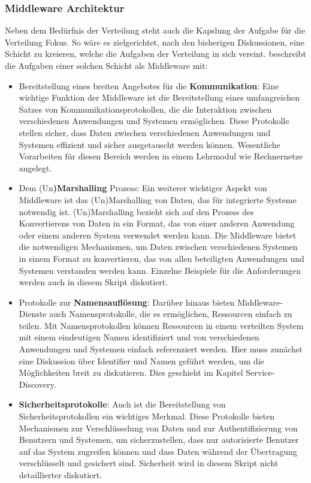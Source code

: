 \documentclass[../vs-script-first-v01.tex]{subfiles}
\begin{document}
\subsubsection{Middleware Architektur}
Neben dem Bedürfnis der Verteilung steht auch die Kapslung der Aufgabe für die Verteilung Fokus. So wäre es zielgerichtet, nach den bisherigen Diskussionen, eine Schicht zu kreieren, welche die Aufgaben der Verteilung in sich vereint.
\cite{tanenbaum2017distributed} beschreibt die Aufgaben einer solchen Schicht als Middleware mit:
\begin{itemize}
\item Bereitstellung eines breiten Angebotes für die \textbf{Kommunikation}: 
Eine wichtige Funktion der Middleware ist die Bereitstellung eines umfangreichen Satzes von Kommunikationsprotokollen, die die Interaktion zwischen verschiedenen Anwendungen und Systemen ermöglichen. Diese Protokolle stellen sicher, dass Daten zwischen verschiedenen Anwendungen und Systemen effizient und sicher ausgetauscht werden können. Wesentliche Vorarbeiten für diesen Bereich werden in einem Lehrmodul wie Rechnernetze angelegt.
\item Dem (Un\textbf{)Marshalling} Prozess: Ein weiterer wichtiger Aspekt von Middleware ist das (Un)Marshalling von Daten, das für integrierte Systeme notwendig ist. (Un)Marshalling bezieht sich auf den Prozess des Konvertierens von Daten in ein Format, das von einer anderen Anwendung oder einem anderen System verwendet werden kann. Die Middleware bietet die notwendigen Mechanismen, um Daten zwischen verschiedenen Systemen in einem Format zu konvertieren, das von allen beteiligten Anwendungen und Systemen verstanden werden kann. Einzelne Beispiele für die Anforderungen werden auch in diesem Skript diskutiert. 
\item Protokolle zur \textbf{Namensauflösung}: Darüber hinaus bieten Middleware-Dienste auch Namensprotokolle, die es ermöglichen, Ressourcen einfach zu teilen. Mit Namensprotokollen können Ressourcen in einem verteilten System mit einem eindeutigen Namen identifiziert und von verschiedenen Anwendungen und Systemen einfach referenziert werden. Hier muss zunächst eine Diskussion über Identifier und Namen geführt werden, um die Möglichkeiten breit zu diskutieren. Dies geschieht im Kapitel Service-Discovery.
\item \textbf{Sicherheitsprotokolle}: Auch ist die Bereitstellung von Sicherheitsprotokollen ein wichtiges Merkmal. Diese Protokolle bieten Mechanismen zur Verschlüsselung von Daten und zur Authentifizierung von Benutzern und Systemen, um sicherzustellen, dass nur autorisierte Benutzer auf das System zugreifen können und dass Daten während der Übertragung verschlüsselt und gesichert sind. Sicherheit wird in diesem Skript nicht detaillierter diskutiert.

\end{itemize}
\end{document}
